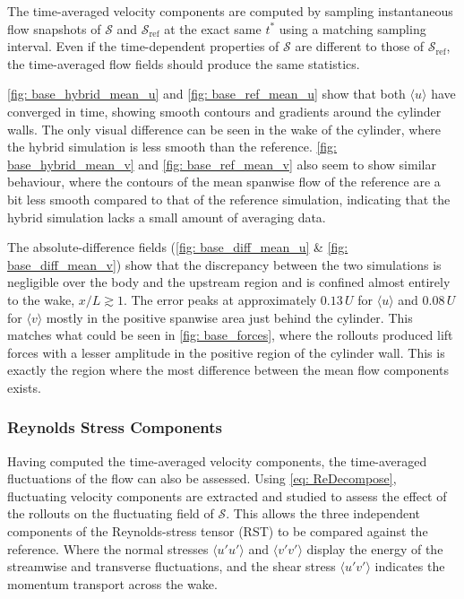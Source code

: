 
The time-averaged velocity components are computed by sampling instantaneous flow snapshots of $\mathcal{S}$ and $\mathcal{S}_\text{ref}$ at the exact same $t^*$ using a matching sampling interval. Even if the time-dependent properties of $\mathcal{S}$ are different to those of $\mathcal{S}_\text{ref}$, the time-averaged flow fields should produce the same statistics. 

\autoref{fig: base_hybrid_mean_u} and \autoref{fig: base_ref_mean_u} show that both $\langle u\rangle$ have converged in time, showing smooth contours and gradients around the cylinder walls. The only visual difference can be seen in the wake of the cylinder, where the hybrid simulation is less smooth than the reference. \autoref{fig: base_hybrid_mean_v} and \autoref{fig: base_ref_mean_v} also seem to show similar behaviour, where the contours of the mean spanwise flow of the reference are a bit less smooth compared to that of the reference simulation, indicating that the hybrid simulation lacks a small amount of averaging data. 

The absolute-difference fields (\autoref{fig: base_diff_mean_u} \& \autoref{fig: base_diff_mean_v}) show that the discrepancy between the two simulations is negligible over the body and the upstream region and is confined almost entirely to the wake, $x/L \gtrsim 1$. The error peaks at approximately $0.13\,U$ for $\langle u\rangle$ and $0.08\,U$ for $\langle v\rangle$ mostly in the positive spanwise area just behind the cylinder. This matches what could be seen in \autoref{fig: base_forces}, where the rollouts produced lift forces with a lesser amplitude in the positive region of the cylinder wall. This is exactly the region where the most difference between the mean flow components exists. 


\subsubsection{Reynolds Stress Components}

Having computed the time-averaged velocity components, the time-averaged fluctuations of the flow can also be assessed. Using \eqref{eq: ReDecompose}, fluctuating velocity components are extracted and studied to assess the effect of the rollouts on the fluctuating field of $\mathcal{S}$. This allows the three independent components of the Reynolds-stress tensor (RST) to be compared against the reference. Where the normal stresses $\langle u'u'\rangle$ and $\langle v'v'\rangle$ display the energy of the streamwise and transverse fluctuations, and the shear stress $\langle u'v'\rangle$ indicates the momentum transport across the wake.


